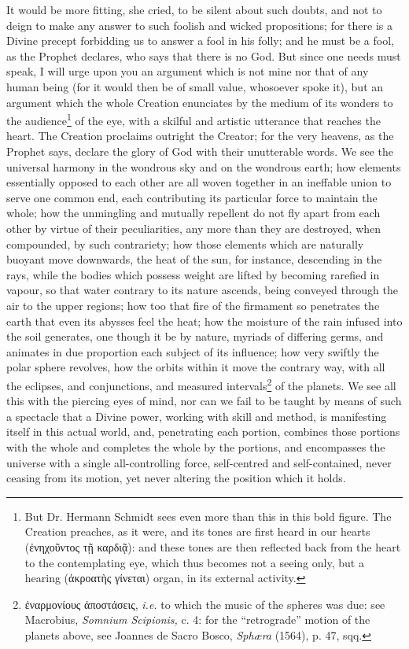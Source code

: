 It would be more fitting, she cried, to be silent about such doubts, and not to deign to make any answer to such foolish and wicked propositions; for there is a Divine precept forbidding us to answer a fool in his folly; and he must be a fool, as the Prophet declares, who says that there is no God. But since one needs must speak, I will urge upon you an argument which is not mine nor that of any human being (for it would then be of small value, whosoever spoke it), but an argument which the whole Creation enunciates by the medium of its wonders to the audience\footnote{But Dr. Hermann Schmidt sees even more than this in this bold figure. The Creation preaches, as it were, and its tones are first heard in our hearts (\textgreek{ἐνηχοῦντος τῇ καρδιᾷ}): and these tones are then reflected back from the heart to the contemplating eye, which thus becomes not a seeing only, but a hearing (\textgreek{ἀκροατὴς γίνεται}) organ, in its external activity.} of the eye, with a skilful and artistic utterance that reaches the heart. The Creation proclaims outright the Creator; for the very heavens, as the Prophet says, declare the glory of God with their unutterable words. We see the universal harmony in the wondrous sky and on the wondrous earth; how elements essentially opposed to each other are all woven together in an ineffable union to serve one common end, each contributing its particular force to maintain the whole; how the unmingling and mutually repellent do not fly apart from each other by virtue of their peculiarities, any more than they are destroyed, when compounded, by such contrariety; how those elements which are naturally buoyant move downwards, the heat of the sun, for instance, descending in the rays, while the bodies which possess weight are lifted by becoming rarefied in vapour, so that water contrary to its nature ascends, being conveyed through the air to the upper regions; how too that fire of the firmament so penetrates the earth that even its abysses feel the heat; how the moisture of the rain infused into the soil generates, one though it be by nature, myriads of differing germs, and animates in due proportion each subject of its influence; how very swiftly the polar sphere revolves, how the orbits within it move the contrary way, with all the eclipses, and conjunctions, and measured intervals\footnote{\textgreek{ἐναρμονίους ἀποστάσεις}, \emph{i.e.} to which the music of the spheres was due: see Macrobius, \emph{Somnium Scipionis,} c. 4: for the “retrograde” motion of the planets above, see Joannes de Sacro Bosco, \emph{Sphæra} (1564), p. 47, sqq.} of the planets. We see all this with the piercing eyes of mind, nor can we fail to be taught by means of such a spectacle that a Divine power, working with skill and method, is manifesting itself in this actual world, and, penetrating each portion, combines those portions with the whole and completes the whole by the portions, and encompasses the universe with a single all-controlling force, self-centred and self-contained, never ceasing from its motion, yet never altering the position which it holds.

